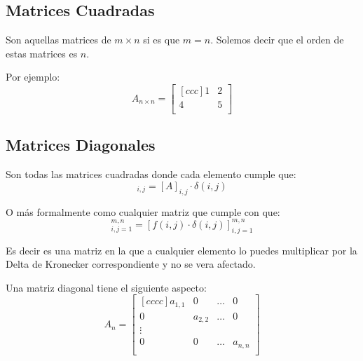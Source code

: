 \documentclass[12pt]{report}                                    %
\begin{document}
            \subsection{Matrices Cuadradas}

                Son aquellas matrices de $m \times n$ si es que $m = n$.
                Solemos decir que el orden de estas matrices es $n$.

                Por ejemplo: 
                \begin{equation*}
                    A_{n \times n} =
                    \begin{bmatrix}[ccc]
                        1 & 2 \\
                        4 & 5 \\
                    \end{bmatrix}
                \end{equation*}

            \subsection{Matrices Diagonales}

                Son todas las matrices cuadradas donde cada elemento cumple que:
                \begin{equation}
                    [A]_{i,j} = [A]_{i,j} \cdot \delta(i,j)
                \end{equation}

                O más formalmente como cualquier matriz que cumple con que:
                \begin{equation}
                    [f(i,j)]_{i, j = 1}^{m, n} = [ f(i,j) \cdot \delta(i,j) ]_{i, j = 1}^{m, n}  
                \end{equation}

                Es decir es una matriz en la que a cualquier elemento lo puedes multiplicar 
                por la Delta de Kronecker correspondiente y no se vera afectado.

                Una matriz diagonal tiene el siguiente aspecto:
                \begin{equation*}
                    A_n =
                    \begin{bmatrix}[cccc]
                        a_{1,1} & 0         & \dots & 0         \\
                        0       & a_{2,2}   & \dots & 0         \\
                        \vdots                                  \\
                        0       & 0         & \dots & a_{n,n}   \\
                    \end{bmatrix}
                \end{equation*}
\end{document}
